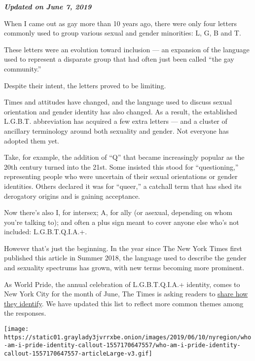 \emph{\textbf{Updated on June 7, 2019}}

When I came out as gay more than 10 years ago, there were only four
letters commonly used to group various sexual and gender minorities: L,
G, B and T.

These letters were an evolution toward inclusion --- an expansion of the
language used to represent a disparate group that had often just been
called ``the gay community.''

Despite their intent, the letters proved to be limiting.

Times and attitudes have changed, and the language used to discuss
sexual orientation and gender identity has also changed. As a result,
the established L.G.B.T. abbreviation has acquired a few extra letters
--- and a cluster of ancillary terminology around both sexuality and
gender. Not everyone has adopted them yet.

Take, for example, the addition of ``Q'' that became increasingly
popular as the 20th century turned into the 21st. Some insisted this
stood for ``questioning,'' representing people who were uncertain of
their sexual orientations or gender identities. Others declared it was
for ``queer,'' a catchall term that has shed its derogatory origins and
is gaining acceptance.

Now there's also I, for intersex; A, for ally (or asexual, depending on
whom you're talking to); and often a plus sign meant to cover anyone
else who's not included: L.G.B.T.Q.I.A.+.

However that's just the beginning. In the year since The New York Times
first published this article in Summer 2018, the language used to
describe the gender and sexuality spectrums has grown, with new terms
becoming more prominent.

As World Pride, the annual celebration of L.G.B.T.Q.I.A.+ identity,
comes to New York City for the month of June, The Times is asking
readers to
\href{https://www.nytimes3xbfgragh.onion/interactive/2019/nyregion/nyc-pride-identity.html}{share
how they identify}. We have updated this list to reflect more common
themes among the responses.

\href{https://www.nytimes3xbfgragh.onion/interactive/2019/nyregion/nyc-pride-identity.html}{}

\texttt{[image: https://static01.graylady3jvrrxbe.onion/images/2019/06/10/nyregion/who-am-i-pride-identity-callout-1557170647557/who-am-i-pride-identity-callout-1557170647557-articleLarge-v3.gif]}

